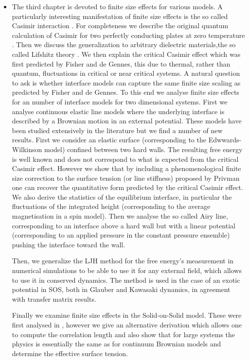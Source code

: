 \begin{itemize}
    \item The third chapter is devoted to finite size effects for various models. A particularly interesting manifestation of finite size effects is the so called Casimir interaction \cite{kimball_a_milton_casimir_2001}. For completeness we describe the original quantum calculation of Casimir for two perfectly conducting plates at zero temperature \cite{h_b_g_casimir_attraction_1948}. Then we discuss the generalization to arbitrary  dielectric materials,the so called Lifshitz theory \cite{lifshits_theory_1955}. We then explain the critical Casimir effect which was first predicted by Fisher and de Gennes, this due to thermal, rather than quantum, fluctuations in critical or near critical systems. A natural question to ask is whether interface models can capture the same finite size scaling as predicted by Fisher and de Gennes. To this end we analyse finite size effects for an number of interface models for two dimensional systems. First we analyse continuous elastic line models where the underlying interface is described by a Brownian motion in an external potential. These models have been studied extensively in the literature but we find a number of new results. First we consider an elastic surface (corresponding to the Edwwards-Wilkinson model) confined between two hard walls. The resulting free energy is well known and does not correspond to what is expected from the critical Casimir effect. However we show that by including a phenomenological finite size correction to the surface tension (or line stiffness) proposed by Privman \cite{privman_finite-size_1988-1} one can recover the quantitative form predicted by the critical Casimir effect. 
We also derive the statistics of the equilibrium interface, in particular the fluctuations of the integrated height (corresponding to the average magnetisation in a spin model). 
Then we analyse the so called Airy line, corresponding to an interface above a hard wall but with a linear potential (corresponding to an applied pressure in the constant pressure ensemble) pushing the interface toward the wall.

{\color{red}Then, we generalize the LJH method \cite{lopes_cardozo_critical_2014} for the free energy's measurement in numerical simulations to be able to use it for any external field, which allows to use it in conserved dynamics. The method is used in the case of an exotic potential in SOS, both in Glauber and Kawasaki dynamics, in agreement with transfer matrix results.}

    Finally we examine finite size effects in the Solid-on-Solid model. These were first analysed in \cite{privman_finite-size_1988-1}, however we give an alternative derivation which allows one to compute the correlation length and also show that for large systems the physics is essentially the same as for continuum Brownian models and determine the effective surface tension.
    

\end{itemize}
